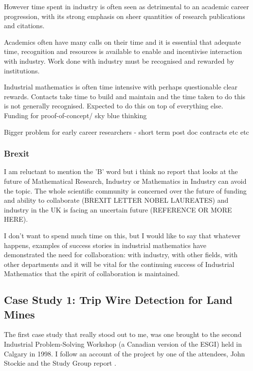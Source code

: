\documentclass[11pt]{article} %
\begin{document}
	However time spent in industry is often seen as detrimental to an academic career progression, with its strong emphasis on sheer quantities of research publications and citations. 
	
	Academics often have many calls on their time and it is essential that adequate time, recognition and resources is available to enable and incentivise interaction with industry. Work done with industry must be recognised and rewarded by institutions. 
	
	Industrial mathematics is often time intensive with perhaps questionable clear rewards. Contacts take time to build and maintain and the time taken to do this is not generally recognised. Expected to do this on top of everything else. Funding for proof-of-concept/ sky blue thinking
	
	Bigger problem for early career researchers - short term post doc contracts etc etc   
	
	
	
	\subsubsection{Brexit}
	I am reluctant to mention the 'B' word but i think no report that looks at the future of Mathematical Research, Industry or Mathematics in Industry can avoid the topic. The whole scientific community is concerned over the future of funding and ability to collaborate (BREXIT LETTER NOBEL LAUREATES) and industry in the UK is facing an uncertain future (REFERENCE OR MORE HERE).
	
	I don't want to spend much time on this, but I would like to say that whatever happens, examples of success stories in industrial mathematics have demonstrated the need for collaboration: with industry, with other fields, with other departments and it will be vital for the continuing success of Industrial Mathematics that the spirit of collaboration is maintained. 
	
	\subsection{Case Study 1: Trip Wire Detection for Land Mines}
	
	The first case study that really stood out to me, was one brought to the second Industrial Problem-Solving Workshop (a Canadian version of the ESGI) held in Calgary in 1998. I follow an account of the project by one of the attendees, John Stockie \cite{Stockie2015} and the Study Group report \cite{Jessop}.
	
\end{document}
